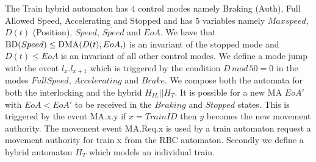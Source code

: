 The Train hybrid automaton has $4$ control modes namely Braking (Auth), Full Allowed Speed, Accelerating and Stopped and has $5$ variables namely $Maxspeed$,$D(t)$ (Position),  $Speed$, $\dot{Speed}$ and $EoA$. We have that $ \BD{Speed} \leq \DMA{D(t), EoA}$ is an invariant of the stopped mode and $D(t) \leq EoA$ is an invariant of all other control modes.
We define a mode jump with the event $l_x.l_{x+1}$ which is triggered by the condition $D \,  mod \, 50 = 0$ in the modes $Full Speed$, $Accelerating$ and $Brake$. 
   We compose both the automata for both the interlocking and the hybrid $H_{IL} || H_{T}$. It is possible for a new MA $EoA'$ with $EoA < EoA'$ to be received in the $Braking$ and $Stopped$ states.  This is triggered by the event MA.x.y if $x = TrainID$ then $y$ becomes the new movement authority. The movement event MA.Req.x is used by a train automaton request a movement authority for train x from the RBC automaton. Secondly we define a hybrid automaton $H_{T}$ which models an individual train. 
\medskip
